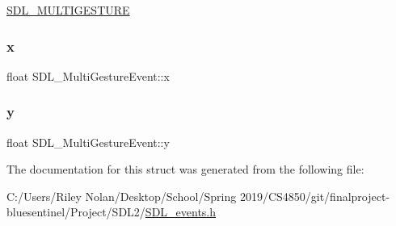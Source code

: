 \mbox{\hyperlink{_s_d_l__events_8h_a3b589e89be6b35c02e0dd34a55f3fccaaa225e29d8bf6e619dda824c81826c929}{S\+D\+L\+\_\+\+M\+U\+L\+T\+I\+G\+E\+S\+T\+U\+RE}} \mbox{\label{struct_s_d_l___multi_gesture_event_a1708fc3c788fd12cc0beb5dc05cf31ca}} 
\subsubsection{\texorpdfstring{x}{x}}
{\footnotesize\ttfamily float S\+D\+L\+\_\+\+Multi\+Gesture\+Event\+::x}

\mbox{\label{struct_s_d_l___multi_gesture_event_a264602b9c5cc027eb6a283adda428454}} 
\subsubsection{\texorpdfstring{y}{y}}
{\footnotesize\ttfamily float S\+D\+L\+\_\+\+Multi\+Gesture\+Event\+::y}



The documentation for this struct was generated from the following file\+:\begin{DoxyCompactItemize}
\item 
C\+:/\+Users/\+Riley Nolan/\+Desktop/\+School/\+Spring 2019/\+C\+S4850/git/finalproject-\/bluesentinel/\+Project/\+S\+D\+L2/\mbox{\hyperlink{_s_d_l__events_8h}{S\+D\+L\+\_\+events.\+h}}\end{DoxyCompactItemize}
